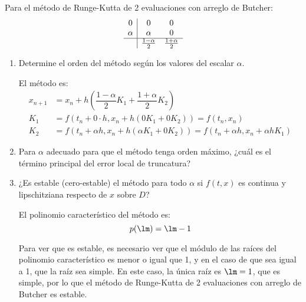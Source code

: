 \begin{ejercicio}\label{ej:3.1.10}
    Para el método de Runge-Kutta de 2 evaluaciones con arreglo de Butcher:
    \begin{equation*}
        \begin{array}{c|cc}
            0 & 0 & 0 \\ 
            \alpha & \alpha & 0 \\ \hline
             & \frac{1-\alpha}{2} & \frac{1+\alpha}{2}
        \end{array}
    \end{equation*}
    \begin{enumerate}
        \item Determine el orden del método según los valores del escalar $\alpha$.
        
        El método es:
        \begin{align*}
            x_{n+1} &= x_n + h \left( \dfrac{1-\alpha}{2} K_1 + \dfrac{1+\alpha}{2} K_2 \right)\\
            K_1 &= f(t_n + 0\cdot h, x_n + h(0K_1 + 0K_2)) = f(t_n, x_n) \\
            K_2 &= f\left(t_n + \alpha h, x_n + h(\alpha K_1 + 0K_2)\right) = f\left(t_n + \alpha h, x_n + \alpha h K_1\right)
        \end{align*}
        \item Para $\alpha$ adecuado para que el método tenga orden máximo, ¿cuál es el término principal del error local de truncatura?
        \item ¿Es estable (cero-estable) el método para todo $\alpha$ si $f(t, x)$ es continua y lipschitziana respecto de $x$ sobre $D$?
        
        El polinomio característico del método es:
        \begin{equation*}
            p(\lm) = \lm - 1
        \end{equation*}

        Para ver que es estable, es necesario ver que el módulo de las raíces del polinomio característico es menor o igual que 1, y en el caso de que sea igual a 1, que la raíz sea simple. En este caso, la única raíz es $\lm = 1$, que es simple, por lo que el método de Runge-Kutta de 2 evaluaciones con arreglo de Butcher es estable.
    \end{enumerate}
\end{ejercicio}


